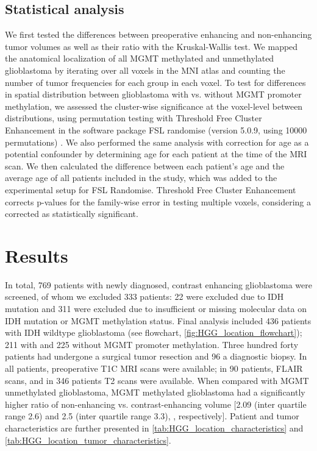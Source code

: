 \subsection{Statistical analysis}
We first tested the differences between preoperative enhancing and non-enhancing \gls{tumor} volumes as well as their ratio with the Kruskal-Wallis test.
We mapped the anatomical localization of all \gls{MGMT} methylated and unmethylated glioblastoma by iterating over all voxels in the \gls{MNI} atlas and counting the number of \gls{tumor} frequencies for each group in each voxel.
To test for differences in spatial distribution between glioblastoma with vs. without \gls{MGMT} promoter methylation, we assessed the cluster-wise significance at the voxel-level between distributions, using permutation testing with Threshold Free Cluster Enhancement \autocite{smith2009threshold} in the software package \gls{FSL} randomise (version 5.0.9, using \num{10000} permutations) \autocite{winkler2014permutation}.
We also performed the same analysis with correction for age as a potential confounder by determining age for each patient at the time of the \gls{MRI} scan.
We then calculated the difference between each patient's age and the average age of all patients included in the study, which was added to the experimental setup for \gls{FSL} Randomise.
Threshold Free Cluster Enhancement corrects p-values for the family-wise error in testing multiple voxels, considering a corrected  as statistically significant.


\section{Results}


In total, 769 patients with newly diagnosed, contrast enhancing glioblastoma were screened, of whom we excluded 333 patients: 22 were excluded due to \gls{IDH} mutation and 311 were excluded due to insufficient or missing molecular data on \gls{IDH} mutation or \gls{MGMT} methylation status.
Final analysis included 436 patients with \gls{IDH} wildtype glioblastoma (see flowchart, \cref{fig:HGG_location_flowchart}); 211 with and 225 without \gls{MGMT} promoter methylation.
Three hundred forty patients had undergone a surgical \gls{tumor} resection and 96 a diagnostic biopsy.
In all patients, preoperative \gls{T1C} \gls{MRI} scans were available; in 90 patients, \gls{FLAIR} scans, and in 346 patients \gls{T2} scans were available.
When compared with \gls{MGMT} unmethylated glioblastoma, \gls{MGMT} methylated glioblastoma had a significantly higher ratio of non-enhancing vs. contrast-enhancing volume [\num{2.09} (inter quartile range \num{2.6}) and \num{2.5} (inter quartile range \num{3.3}), , respectively].
Patient and \gls{tumor} characteristics are further presented in \cref{tab:HGG_location_characteristics} and \cref{tab:HGG_location_tumor_characteristics}.


